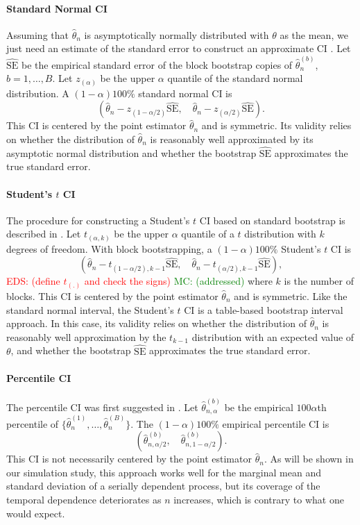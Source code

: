 \documentclass[12pt, letterpaper, titlepage]{article}
\newcommand{\eds}[1]{\textcolor{red}{EDS: (#1)}}
\newcommand{\mc}[1]{\textcolor{green}{MC: (#1)}}
\begin{document}
\paragraph{Standard Normal CI}
Assuming that $\hat\theta_n$ is asymptotically normally distributed with
$\theta$ as the mean, we just need an estimate of the standard error to
construct an approximate CI \citep[p.168]{efron1993introduction}.
Let $\widehat{\text{SE}}$ be the empirical standard error of the block bootstrap
copies of $\hat\theta_n^{(b)}$, $b = 1, \ldots, B$. Let $z_{(\alpha)}$ be the
upper $\alpha$ quantile of the standard normal distribution.
A $(1 - \alpha)100\%$ standard normal CI is
\[
(\hat{\theta}_{n} - z_{(1-\alpha/2)}\widehat{\text{SE}}, \quad
\hat{\theta}_{n} - z_{(\alpha/2)}\widehat{\text{SE}}).
\]
This CI is centered by the point estimator $\hat\theta_n$ and is symmetric.
Its validity relies on whether the distribution of $\hat\theta_n$ is reasonably
well approximated by its asymptotic normal distribution and whether the
bootstrap $\widehat{\text{SE}}$ approximates the true standard error.


\paragraph{Student's $t$ CI}
The procedure for constructing a Student's $t$ CI based on standard bootstrap is
described in \citet[p.158]{efron1993introduction}. Let $t_{(\alpha, k)}$ be the
upper $\alpha$ quantile of a $t$ distribution with $k$ degrees of freedom.
With block bootstrapping, a $(1 - \alpha)100\%$ Student's $t$ CI is
\[
(\hat{\theta}_{n} - t_{(1-\alpha/2), k - 1}\hat{\text{SE}}, \quad
\hat{\theta}_{n} - t_{(\alpha/2), k -1}\hat{\text{SE}}),
\]
\eds{define $t_{(.)}$ and check the signs}  \mc{addressed}
where $k$ is the number of blocks.
This CI is centered by the point estimator $\hat\theta_n$ and is symmetric.
Like the standard 
normal interval, the Student's $t$ CI is a table-based bootstrap interval
approach. In this case,
its validity relies on whether the distribution of $\hat\theta_n$ is
reasonably well approximation by the $t_{k-1}$ distribution with an
expected value of $\theta$, and whether the bootstrap 
$\widehat{\text{SE}}$ approximates the true standard error.


\paragraph{Percentile CI}
The percentile CI was first suggested in \citet{efron1979bootstrap}.
Let $\hat\theta_{n, \alpha}^{(b)}$ be the empirical $100\alpha$th percentile of
$\{\hat\theta_n^{(1)}, \ldots, \hat\theta_n^{(B)}\}$. The $(1 - \alpha)100\%$
empirical percentile CI is
\[
(\hat\theta_{n, \alpha/2}^{(b)}, \quad \hat\theta_{n, 1 - \alpha/2}^{(b)}).
\]
This CI is not necessarily centered by the point estimator $\hat\theta_n$.
As will be shown in our simulation study, this approach works well for the
marginal mean and standard deviation of a serially dependent process, but its
coverage of the temporal dependence deteriorates as $n$ increases, which is
contrary to what one would expect.
\end{document}
